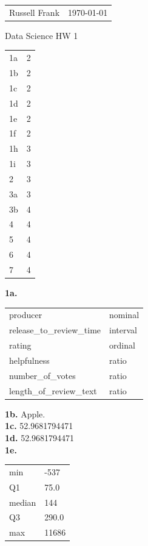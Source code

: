 \documentclass[10pt]{amsart}
\makeatletter
\newcommand{\head}[1]{
   \begin{tabular*}{7.1in}{@{}l@{\extracolsep{\fill}}r}
      Russell Frank & \today \\
   \end{tabular*}
   \begin{center} \LARGE #1 \normalsize \end{center}
   \vskip 0.1in
}
\makeatother
\begin{document}
\head{Data Science HW 1}

\begin{center}

\begin{tabular}{l|l}
  1a & 2 \\
  1b & 2 \\
  1c & 2 \\
  1d & 2 \\
  1e & 2 \\
  1f & 2 \\
  1h & 3 \\
  1i & 3 \\
  2 & 3 \\
  3a & 3 \\
  3b & 4 \\
  4 & 4 \\
  5 & 4 \\
  6 & 4 \\
  7 & 4 \\
\end{tabular}

\end{center}

\newpage

\textbf{1a.}

\begin{tabular}{ll}
  producer & nominal \\
  release\_to\_review\_time & interval \\
  rating & ordinal \\
  helpfulness & ratio \\
  number\_of\_votes & ratio \\
  length\_of\_review\_text & ratio \\
\end{tabular}

\textbf{1b.} Apple. \\

\textbf{1c.} 52.9681794471 \\

\textbf{1d.} 52.9681794471 \\

\textbf{1e.} 

\begin{tabular}{ll}
  min & -537 \\
  Q1 & 75.0 \\
  median & 144 \\
  Q3 & 290.0 \\
  max & 11686 \\
\end{tabular}
\end{document}
